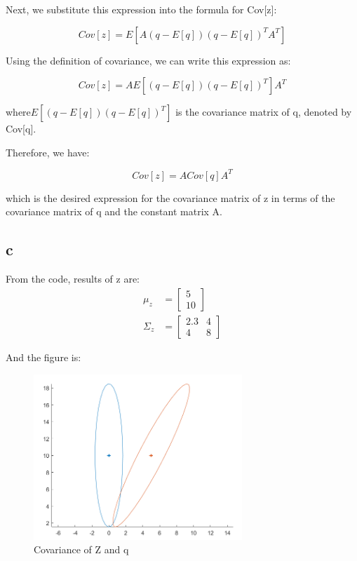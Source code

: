 Next, we substitute this expression into the formula for Cov[z]:

$$Cov[z] = E[A(q - E[q])(q - E[q])^T A^T]$$

Using the definition of covariance, we can write this expression as:

$$Cov[z] = AE[(q - E[q])(q - E[q])^T]A^T$$

where$ E[(q - E[q])(q - E[q])^T]$ is the covariance matrix of q, denoted by Cov[q].

Therefore, we have:

$$Cov[z] = ACov[q]A^T$$

which is the desired expression for the covariance matrix of z in terms of the covariance matrix of q and the constant matrix A.

\subsection{c}
From the code, results of z are:
\begin{equation}
    \begin{aligned}
        \mu_z&=\begin{bmatrix} 5\\10 \end{bmatrix} \\
        \Sigma_z&=\begin{bmatrix} 2.3 &4\\4&8 \end{bmatrix}\nonumber
    \end{aligned}
\end{equation}

And the figure is:

\begin{figure}[H]
 \centering
 \includegraphics[width=0.7\textwidth]{images/picfor1c.png}
 \caption{Covariance of Z and q}
 \label{1c}
\end{figure}

